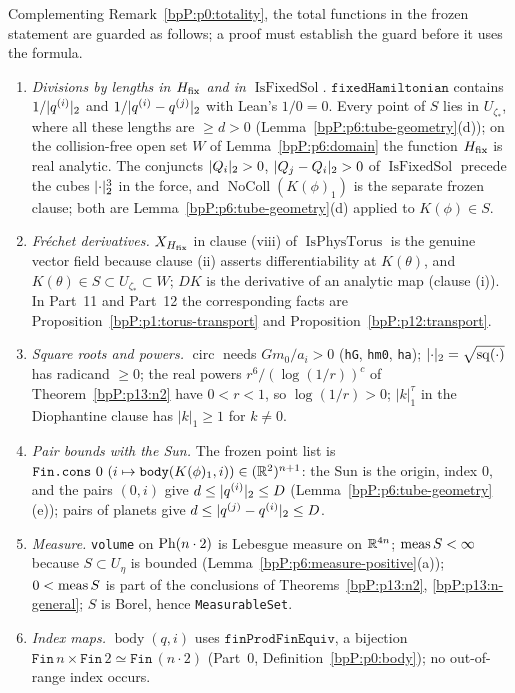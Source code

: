 \begin{remark}\label{bpP:p13:totality}
Complementing Remark~\ref{bpP:p0:totality}, the total functions in the frozen statement are guarded as follows; a proof must establish the guard before it uses the formula.
\begin{enumerate}[label=(T\arabic*)]
\item \emph{Divisions by lengths in $H_{\rm fix}$ and in $\operatorname{IsFixedSol}$.} $\texttt{fixedHamiltonian}$ contains $1/\lvert q^{(i)}\rvert_2$ and $1/\lvert q^{(i)}-q^{(j)}\rvert_2$ with Lean's $1/0=0$. Every point of $S$ lies in $U_{\zeta_*}$, where all these lengths are $\ge d>0$ (Lemma~\ref{bpP:p6:tube-geometry}(d)); on the collision-free open set $W$ of Lemma~\ref{bpP:p6:domain} the function $H_{\rm fix}$ is real analytic. The conjuncts $\lvert Q_i\rvert_2>0$, $\lvert Q_j-Q_i\rvert_2>0$ of $\operatorname{IsFixedSol}$ precede the cubes $\lvert \cdot\rvert_2^3$ in the force, and $\operatorname{NoColl}(K(\phi)_1)$ is the separate frozen clause; both are Lemma~\ref{bpP:p6:tube-geometry}(d) applied to $K(\phi)\in S$.
\item \emph{Fr\'echet derivatives.} $X_{H_{\rm fix}}$ in clause (viii) of $\operatorname{IsPhysTorus}$ is the genuine vector field because clause (ii) asserts differentiability at $K(\theta)$, and $K(\theta)\in S\subset U_{\zeta_*}\subset W$; $DK$ is the derivative of an analytic map (clause (i)). In Part~11 and Part~12 the corresponding facts are Proposition~\ref{bpP:p1:torus-transport} and Proposition~\ref{bpP:p12:transport}.
\item \emph{Square roots and powers.} $\operatorname{circ}$ needs $Gm_0/a_i>0$ (\texttt{hG}, \texttt{hm0}, \texttt{ha}); $\lvert \cdot\rvert_2=\sqrt{\operatorname{sq}(\cdot)}$ has radicand $\ge0$; the real powers $r^6/(\log(1/r))^{c}$ of Theorem~\ref{bpP:p13:n2} have $0<r<1$, so $\log(1/r)>0$; $|k|_1^\tau$ in the Diophantine clause has $|k|_1\ge1$ for $k\ne0$.
\item \emph{Pair bounds with the Sun.} The frozen point list is $\texttt{Fin.cons}\ 0\ (i\mapsto\texttt{body}(K(\phi)_1,i))\in(\R^2)^{n+1}$: the Sun is the origin, index $0$, and the pairs $(0,i)$ give $d\le\lvert q^{(i)}\rvert_2\le D$ (Lemma~\ref{bpP:p6:tube-geometry}(e)); pairs of planets give $d\le\lvert q^{(j)}-q^{(i)}\rvert_2\le D$.
\item \emph{Measure.} \texttt{volume} on $\mathrm{Ph}(n\cdot2)$ is Lebesgue measure on $\mathbb{R}^{4n}$; $\operatorname{meas} S<\infty$ because $S\subset U_\eta$ is bounded (Lemma~\ref{bpP:p6:measure-positive}(a)); $0<\operatorname{meas} S$ is part of the conclusions of Theorems~\ref{bpP:p13:n2}, \ref{bpP:p13:n-general}; $S$ is Borel, hence \texttt{MeasurableSet}.
\item \emph{Index maps.} $\operatorname{body}(q,i)$ uses $\texttt{finProdFinEquiv}$, a bijection $\texttt{Fin}\,n\times\texttt{Fin}\,2\simeq\texttt{Fin}\,(n\cdot2)$ (Part~0, Definition~\ref{bpP:p0:body}); no out-of-range index occurs.
\end{enumerate}
\end{remark}

